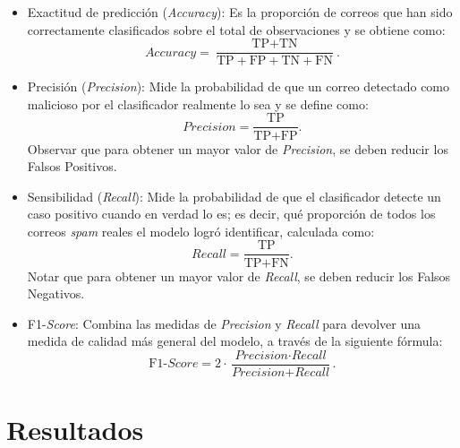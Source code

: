 \documentclass[a4paper,11pt ,openany]{book}
\begin{document}
\begin{itemize}
    \item Exactitud de predicción (\textit{Accuracy}): Es la proporción de correos que han sido correctamente clasificados sobre el total de observaciones y se obtiene como:
    \begin{equation}
        \textit{Accuracy} = \frac{\text{TP} + \text{TN}}{\text{TP} + \text{FP} + \text{TN} + \text{FN}}.
    \end{equation}

    \item Precisión (\textit{Precision}): Mide la probabilidad de que un correo detectado como malicioso por el clasificador realmente lo sea y se define como:
    \begin{equation}
        \textit{Precision} = \frac{\text{TP}}{\text{TP} + \text{FP}}.
    \end{equation}
    Observar que para obtener un mayor valor de \textit{Precision}, se deben reducir los Falsos Positivos.

    \item Sensibilidad (\textit{Recall}): Mide la probabilidad de que el clasificador detecte un caso positivo cuando en verdad lo es; es decir, qué proporción de todos los correos \textit{spam} reales el modelo logró identificar, calculada como: 
    \begin{equation}
        \textit{Recall} = \frac{\text{TP}}{\text{TP} + \text{FN}}.
    \end{equation}
	Notar que para obtener un mayor valor de \textit{Recall}, se deben reducir los Falsos Negativos.
	
    \item F1-\textit{Score}: Combina las medidas de \textit{Precision} y \textit{Recall} para devolver una medida de calidad más general del modelo, a través de la siguiente fórmula:
    \begin{equation}
        \text{F1-}\textit{Score} = 2 \cdot \frac{\textit{Precision} \cdot \textit{Recall}}{\textit{Precision} + \textit{Recall}}.
    \end{equation}
\end{itemize}


\chapter{Resultados}
\label{ch:resultados}

\end{document}
